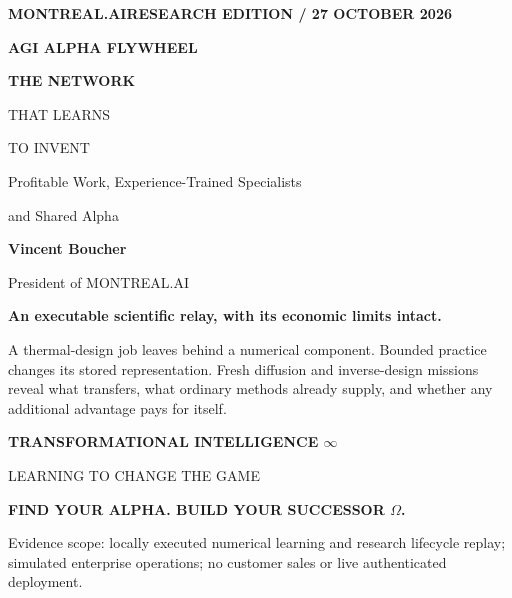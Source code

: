 \documentclass[11pt,letterpaper]{article}
\begin{document}
\begin{titlepage}
\color{navy}
{\sffamily\bfseries\large MONTREAL.AI\hfill RESEARCH EDITION / 27 OCTOBER 2026}\par
\vspace{1.0in}
{\sffamily\bfseries\Large AGI ALPHA FLYWHEEL}\par
\vspace{0.22in}
{\sffamily\bfseries\fontsize{34}{39}\selectfont THE NETWORK\par THAT LEARNS\par TO INVENT}\par
\vspace{0.25in}
{\Large Profitable Work, Experience-Trained Specialists\par and Shared Alpha}\par
\vspace{0.38in}
{\Large\bfseries Vincent Boucher}\par
{\large President of MONTREAL.AI}\par
\vspace{0.45in}
\begin{tcolorbox}[colback=pale,colframe=pale,boxrule=0pt,arc=0pt,left=14pt,right=14pt,top=12pt,bottom=12pt]
\color{navy}\textbf{An executable scientific relay, with its economic limits intact.}\par
A thermal-design job leaves behind a numerical component. Bounded practice changes its stored representation. Fresh diffusion and inverse-design missions reveal what transfers, what ordinary methods already supply, and whether any additional advantage pays for itself.
\end{tcolorbox}
\vfill
{\sffamily\bfseries TRANSFORMATIONAL INTELLIGENCE $\infty$}\par
{\sffamily LEARNING TO CHANGE THE GAME}\par
\vspace{0.12in}
{\sffamily\bfseries FIND YOUR ALPHA. BUILD YOUR SUCCESSOR $\Omega$.}\par
\vspace{0.2in}
{\small\color{black}Evidence scope: locally executed numerical learning and research lifecycle replay; simulated enterprise operations; no customer sales or live authenticated deployment.}
\end{titlepage}
\end{document}
